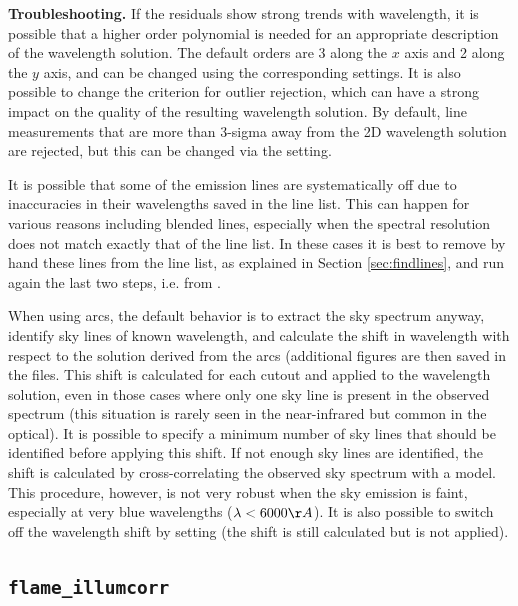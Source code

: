 \documentclass[a4paper]{article}
\begin{document}
\begin{sloppypar}
\medskip
\noindent
\textbf{Troubleshooting.} If the residuals show strong trends with wavelength, it is possible that a higher order polynomial is needed for an appropriate description of the wavelength solution. The default orders are 3 along the $x$ axis and 2 along the $y$ axis, and can be changed using the corresponding settings. It is also possible to change the criterion for outlier rejection, which can have a strong impact on the quality of the resulting wavelength solution. By default, line measurements that are more than 3-sigma away from the 2D wavelength solution are rejected, but this can be changed via the  setting.

It is possible that some of the emission lines are systematically off due to inaccuracies in their wavelengths saved in the line list. This can happen for various reasons including blended lines, especially when the spectral resolution does not match exactly that of the line list. In these cases it is best to remove by hand these lines from the line list, as explained in Section \ref{sec:findlines}, and run again the last two steps, i.e. from .

When using arcs, the default behavior is to extract the sky spectrum anyway, identify sky lines of known wavelength, and calculate the shift in wavelength with respect to the solution derived from the arcs (additional figures are then saved in the  files. This shift is calculated for each cutout and applied to the wavelength solution, even in those cases where only one sky line is present in the observed spectrum (this situation is rarely seen in the near-infrared but common in the optical). It is possible to specify a minimum number of sky lines that should be identified before applying this shift. If not enough sky lines are identified, the shift is calculated by cross-correlating the observed sky spectrum with a model. This procedure, however, is not very robust when the sky emission is faint, especially at very blue wavelengths ($\lambda < 6000\AA$). It is also possible to switch off the wavelength shift by setting  (the shift is still calculated but is not applied).


\subsection{\texttt{flame\_illumcorr}}
\label{sec:illumcorr}


\end{sloppypar}
\end{document}
